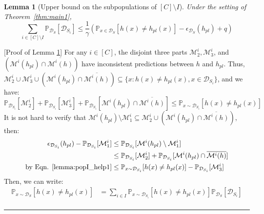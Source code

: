 \documentclass{article}
\newcommand{\BlackBox}{\rule{1.5ex}{1.5ex}}  \fi
\newenvironment{proof}{\par\noindent{\em Proof:\ }}{\hfill\BlackBox\\[.0mm]}
\newtheorem{lemma}{Lemma}[section]
\begin{document}
\begin{lemma}[Upper bound on the subpopulations of ${[C] \setminus I}$]\label{lemma:popI} Under the setting of Theorem~\ref{thm:main1},
$$\sum_{i\in [C]\setminus I}\mathbb{P}_{\mathcal{D}_S}[\mathcal{D}_{S_i}] \leq \frac{1}{\gamma}(\mathbb{P}_{x\in\mathcal{D}_{S}}[h(x)\neq h_{pl}(x)]-\epsilon_{\mathcal{D}_{S}}(h_{pl})+q)$$
\end{lemma}
\begin{proof}[Proof of Lemma \ref{lemma:popI}]
For any $i\in [C]$, the disjoint three parts  $\mathcal{M}^i_2, \mathcal{M}^i_3$, and $(\mathcal{M}^i(h_{pl})\cap \overline{\mathcal{M}^i(h)})$ have inconsistent predictions between $h$ and $h_{pl}$. Thus, $\mathcal{M}^i_2 \cup \mathcal{M}^i_3 \cup (\mathcal{M}^i(h_{pl})\cap \overline{\mathcal{M}^i(h)})\subseteq \{x: h(x)\neq h_{pl}(x), x\in \mathcal{D}_{S_i}\}$, and we have:
\begin{equation}\label{lemma:popI_help1}
    \mathbb{P}_{\mathcal{D}_{S_i}}[\mathcal{M}^i_2]+ \mathbb{P}_{\mathcal{D}_{S_i}}[\mathcal{M}^i_3]+ \mathbb{P}_{\mathcal{D}_{S_i}}[\mathcal{M}^i(h_{pl})\cap \overline{\mathcal{M}^i(h)}]
    \leq 
    \mathbb{P}_{x\sim \mathcal{D}_{S_i}}[h(x)\neq h_{pl}(x)]
\end{equation}
It is not hard to verify that $\mathcal{M}^i(h_{pl})\setminus \mathcal{M}^i_1 \subseteq \mathcal{M}^i_2 \cup (\mathcal{M}^i(h_{pl})\cap \overline{\mathcal{M}^i(h)})$, then:
\begin{equation}\label{lemma:popI_help2}
\begin{aligned}
    \epsilon_{\mathcal{D}_{S_i}}(h_{pl})-\mathbb{P}_{\mathcal{D}_{S_i}}[\mathcal{M}_1^i] &\leq \mathbb{P}_{\mathcal{D}_{S_i}}[\mathcal{M}^i(h_{pl})\setminus \mathcal{M}^i_1] \\
    & \leq \mathbb{P}_{\mathcal{D}_{S_i}}[\mathcal{M}^i_2]+ \mathbb{P}_{\mathcal{D}_{S_i}}[\mathcal{M}^i(h_{pl})\cap \overline{\mathcal{M}^i(h)}]\\
    \text{by Eqn. \ref{lemma:popI_help1}}& \leq \mathbb{P}_{x\sim \mathcal{D}_{S_i}}[h(x)\neq h_{pl}(x)] - \mathbb{P}_{\mathcal{D}_{S_i}}[\mathcal{M}^i_3]
\end{aligned}
\end{equation}
Then, we can write:
\begin{equation}\label{lemma:popI_help3}
    \begin{aligned}
        \mathbb{P}_{x\sim \mathcal{D}_{S}}[h(x)\neq h_{pl}(x)] &= \sum_{i\in I} \mathbb{P}_{x\sim \mathcal{D}_{S_i}}[h(x)\neq h_{pl}(x)] \mathbb{P}_{\mathcal{D}_{S}}[\mathcal{D}_{S_i}] \\

\end{aligned}
\end{equation}
\end{proof}
\end{document}
